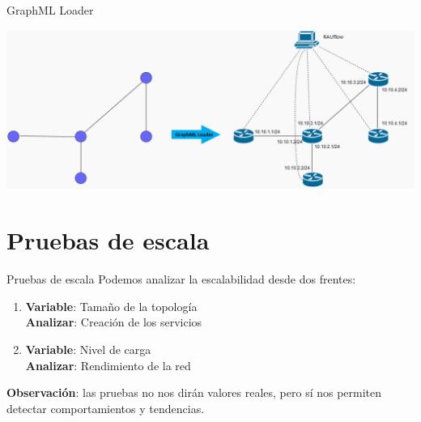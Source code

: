 \documentclass[xcolor=svgnames]{beamer}
\begin{document}
\begin{frame}{GraphML Loader}
	\begin{center}
		\includegraphics[scale=0.4]{loader}
	\end{center}
\end{frame}

\section{Pruebas de escala}

\begin{frame}{}
	\tableofcontents[currentsection]
\end{frame}

\begin{frame}{Pruebas de escala}
	Podemos analizar la escalabilidad desde dos frentes:
	\begin{enumerate}
		\item \textbf{Variable}: Tamaño de la topología \\
		\textbf{Analizar}: Creación de los servicios
		\item \textbf{Variable}: Nivel de carga \\
		\textbf{Analizar}: Rendimiento de la red \\
	\end{enumerate}
	\pause
	\vspace{4mm}
	\textbf{Observación}: las pruebas no nos dirán valores reales, pero sí nos permiten detectar comportamientos y tendencias.
\end{frame}
\end{document}
